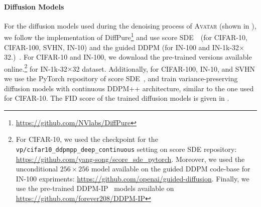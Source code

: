 \documentclass[conference]{IEEEtran}
\theoremstyle{definition}
\theoremstyle{remark}
\theoremstyle{proposition}
\begin{document}
\paragraph{Diffusion Models}
For the diffusion models used during the denoising process of \textsc{Avatar} (shown in ), we follow the implementation of DiffPure\footnote{\url{https://github.com/NVlabs/DiffPure}} and use score SDE~\citep{song2021scoresde}~(for CIFAR-10, CIFAR-100, SVHN, IN-10) and the guided DDPM (for IN-100 and IN-1k-32$\times$32.)~\citep{dhariwal2021diffusion}.
For CIFAR-10 and IN-100, we download the pre-trained versions available online.\footnote{For CIFAR-10, we used the checkpoint for the \texttt{vp/cifar10\_ddpmpp\_deep\_continuous} setting on score SDE repository: \url{https://github.com/yang-song/score_sde_pytorch}. 
Moreover, we used the unconditional $256 \times 256$ model available on the guided DDPM code-base for IN-100 expriments: \url{https://github.com/openai/guided-diffusion}.
Finally, we use the pre-trained DDPM-IP~\citep{ning2023ddpmip} models available on \url{https://github.com/forever208/DDPM-IP}} for IN-1k-32$\times$32 dataset.
Additionally, for CIFAR-100, IN-10, and SVHN we use the PyTorch repository of score SDE~\citep{song2021scoresde}, and train variance-preserving diffusion models with continuous DDPM++ architecture, similar to the one used for CIFAR-10.
The FID score of the trained diffusion models is given in .
\end{document}

